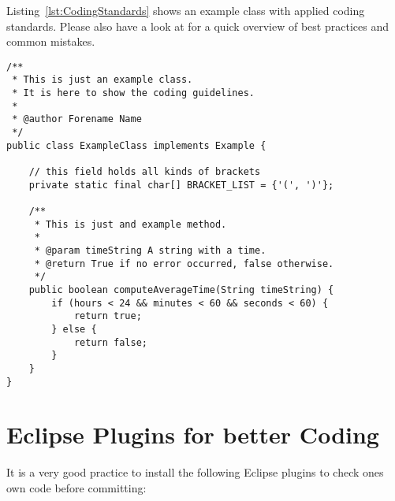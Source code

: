 Listing~\ref{lst:CodingStandards} shows an example class with applied coding standards. Please also have a look at \cite{JavaCodeConventions, JavaAntiPatterns} for a quick overview of best practices and common mistakes.

\begin{codelisting}
\begin{lstlisting}[caption=Example class for coding guidelines,label=lst:CodingStandards,frame=tb]
/**
 * This is just an example class.
 * It is here to show the coding guidelines.
 * 
 * @author Forename Name
 */
public class ExampleClass implements Example {

	// this field holds all kinds of brackets
	private static final char[] BRACKET_LIST = {'(', ')'};

	/**
	 * This is just and example method.
	 * 
	 * @param timeString A string with a time.
	 * @return True if no error occurred, false otherwise.
	 */
	public boolean computeAverageTime(String timeString) {
		if (hours < 24 && minutes < 60 && seconds < 60) {
			return true;
		} else {
			return false;
		}
	}
}
\end{lstlisting}
\end{codelisting}

\section{Eclipse Plugins for better Coding}
\label{sec:eclipseCodingPlugins}

It is a very good practice to install the following Eclipse plugins to check ones own code before committing:

